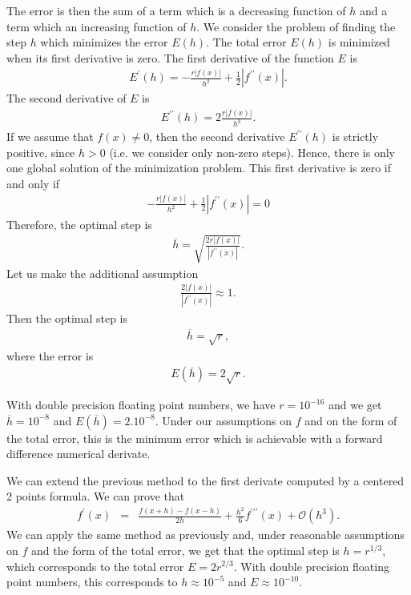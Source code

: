 The error is then the sum of a
term which is a decreasing function of $h$ and a term which an increasing function of $h$.
We consider the problem of finding the step $h$ which minimizes the error $E(h)$.
The total error $E(h)$ is minimized when its first derivative is zero.
The first derivative of the function $E$ is 
\begin{eqnarray}
E^\prime(h) = -\frac{r|f(x)|}{h^2} + \frac{1}{2} |f^{\prime \prime}(x)|.
\end{eqnarray}
The second derivative of $E$ is 
\begin{eqnarray}
E^{\prime\prime}(h) = 2\frac{r|f(x)|}{h^3}.
\end{eqnarray}
If we assume that $f(x)\neq 0$, then the second derivative $E^{\prime\prime}(h)$ is 
strictly positive, since $h>0$ (i.e. we consider only non-zero steps).
Hence, there is only one global solution of the minimization problem.
This first derivative is zero if and only if 
\begin{eqnarray}
-\frac{r|f(x)|}{h^2} + \frac{1}{2} |f^{\prime \prime}(x)| = 0
\end{eqnarray}
Therefore, the optimal step is 
\begin{eqnarray}
\overline{h} = \sqrt{\frac{2r|f(x)|}{|f^{\prime \prime}(x)|}}.
\end{eqnarray}
Let us make the additional assumption 
\begin{eqnarray}
\frac{2|f(x)|}{|f^{\prime \prime}(x)|} \approx 1.
\end{eqnarray}
Then the optimal step is 
\begin{eqnarray}
\overline{h} = \sqrt{r},
\end{eqnarray}
where the error is 
\begin{eqnarray}
E(\overline{h}) = 2 \sqrt{r}.
\end{eqnarray}

With double precision floating point numbers, we have $r=10^{-16}$ and 
we get $\overline{h} = 10^{-8}$ and $E(\overline{h})=2. 10^{-8}$.
Under our assumptions on $f$ and on the form of the total error, this is the 
minimum error which is achievable with a forward difference
numerical derivate.

We can extend the previous method to the first derivate computed by a centered 2 points 
formula. We can prove that 
\begin{eqnarray}
f^\prime(x) &=& \frac{f(x+h) - f(x-h)}{2h} + \frac{h^2}{6} f^{\prime \prime \prime}(x) + \mathcal{O}(h^3).
\end{eqnarray}
We can apply the same method as previously and, under reasonable assumptions
on $f$ and the form of the total error, we get that the 
optimal step is $h = r^{1/3}$, which corresponds to the total error $E=2r^{2/3}$.
With double precision floating point numbers, this corresponds to 
$h \approx 10^{-5}$ and $E\approx 10^{-10}$.

